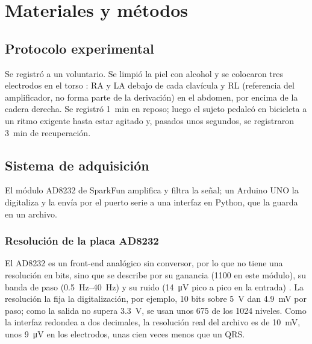 \section{Materiales y métodos}
\label{sec:metodos}

\subsection{Protocolo experimental}
\label{sec:protocolo}
Se registró a un voluntario. Se limpió la piel con alcohol y se colocaron tres electrodos en el torso \parencite{sparkfun_guia}: RA y LA debajo de cada clavícula y RL (referencia del amplificador, no forma parte de la derivación) en el abdomen, por encima de la cadera derecha. Se registró \SI{1}{\minute} en reposo; luego el sujeto pedaleó en bicicleta a un ritmo exigente hasta estar agitado y, pasados unos segundos, se registraron \SI{3}{\minute} de recuperación.

\subsection{Sistema de adquisición}
\label{sec:adquisicion}
El módulo AD8232 de SparkFun amplifica y filtra la señal; un Arduino UNO la digitaliza y la envía por el puerto serie a una interfaz en Python, que la guarda en un archivo.

\subsubsection{Resolución de la placa AD8232}
\label{sec:resolucion}
El AD8232 es un front-end analógico sin conversor, por lo que no tiene una resolución en bits, sino que se describe por su ganancia (1100 en este módulo), su banda de paso (\SIrange{0.5}{40}{\hertz}) y su ruido (\SI{14}{\micro\volt} pico a pico en la entrada) \parencite{analog_ad8232,sparkfun_hw}. La resolución la fija la digitalización, por ejemplo, 10 bits sobre \SI{5}{\volt} dan \SI{4.9}{\milli\volt} por paso; como la salida no supera \SI{3.3}{\volt}, se usan unos 675 de los 1024 niveles. Como la interfaz redondea a dos decimales, la resolución real del archivo es de \SI{10}{\milli\volt}, unos \SI{9}{\micro\volt} en los electrodos, unas cien veces menos que un QRS.

